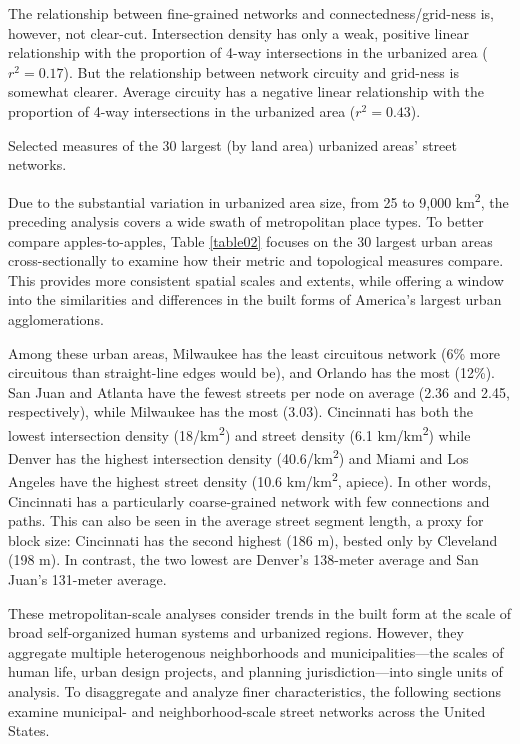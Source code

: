 \documentclass{article}
\begin{document}
The relationship between fine-grained networks and connectedness/grid-ness is, however, not clear-cut. Intersection density has only a weak, positive linear relationship with the proportion of 4-way intersections in the urbanized area ($r^{2}=0.17$). But the relationship between network circuity and grid-ness is somewhat clearer. Average circuity has a negative linear relationship with the proportion of 4-way intersections in the urbanized area ($r^{2}=0.43$).

\begin{table}[hp]
\caption{Selected measures of the 30 largest (by land area) urbanized areas' street networks.}
\label{table02}
\end{table}

Due to the substantial variation in urbanized area size, from 25 to 9,000 km\textsuperscript{2}, the preceding analysis covers a wide swath of metropolitan place types. To better compare apples-to-apples, Table \ref{table02} focuses on the 30 largest urban areas cross-sectionally to examine how their metric and topological measures compare. This provides more consistent spatial scales and extents, while offering a window into the similarities and differences in the built forms of America's largest urban agglomerations. 

Among these urban areas, Milwaukee has the least circuitous network (6\% more circuitous than straight-line edges would be), and Orlando has the most (12\%). San Juan and Atlanta have the fewest streets per node on average (2.36 and 2.45, respectively), while Milwaukee has the most (3.03). Cincinnati has both the lowest intersection density (18/km\textsuperscript{2}) and street density (6.1 km/km\textsuperscript{2}) while Denver has the highest intersection density (40.6/km\textsuperscript{2}) and Miami and Los Angeles have the highest street density (10.6 km/km\textsuperscript{2}, apiece). In other words, Cincinnati has a particularly coarse-grained network with few connections and paths. This can also be seen in the average street segment length, a proxy for block size: Cincinnati has the second highest (186 m), bested only by Cleveland (198 m). In contrast, the two lowest are Denver's 138-meter average and San Juan's 131-meter average.

These metropolitan-scale analyses consider trends in the built form at the scale of broad self-organized human systems and urbanized regions. However, they aggregate multiple heterogenous neighborhoods and municipalities---the scales of human life, urban design projects, and planning jurisdiction---into single units of analysis. To disaggregate and analyze finer characteristics, the following sections examine municipal- and neighborhood-scale street networks across the United States.
\end{document}
